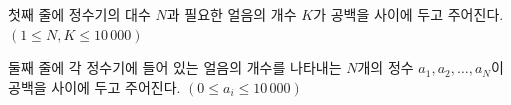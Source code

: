 첫째 줄에 정수기의 대수 $N$과 필요한 얼음의 개수 $K$가 공백을 사이에 두고 주어진다. $(1\le N,K\le 10\,000)$

둘째 줄에 각 정수기에 들어 있는 얼음의 개수를 나타내는 $N$개의 정수 $a_1,a_2,\ldots,a_N$이 공백을 사이에 두고 주어진다. $(0\le a_i\le 10\,000)$